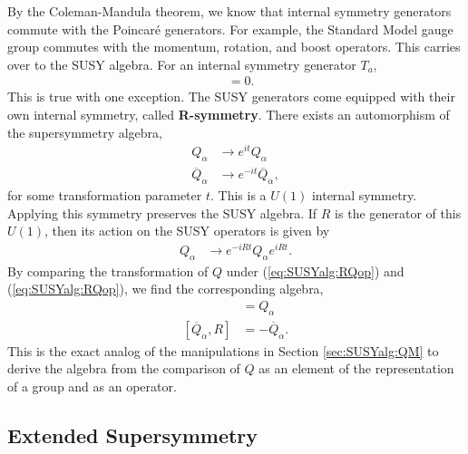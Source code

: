 \documentclass[12pt, oneside]{report}    %
\begin{document}
By the Coleman-Mandula theorem, we know that internal symmetry generators commute with the Poincar\'e generators. For example, the Standard Model gauge group commutes with the momentum, rotation, and boost operators. This carries over to the SUSY algebra. For an internal symmetry generator $T_a$,
\begin{align}
    [T_a,Q_\alpha] &= 0.
\end{align}
This is true with one exception. The SUSY generators come equipped with their own internal symmetry, called \textbf{R-symmetry}. There exists an automorphism of the supersymmetry algebra,
\begin{align}
    Q_\alpha &\rightarrow e^{it}Q_\alpha \label{eq:SUSYalg:RQ}\\
    \overline Q_{\dot\alpha} &\rightarrow e^{-it}\overline Q_{\dot\alpha},\label{eq:SUSYalg:RQbar}
\end{align}
for some transformation parameter $t$.
This is a $U(1)$ internal symmetry. Applying this symmetry preserves the SUSY algebra. If $R$ is the generator of this $U(1)$, then its action on the SUSY operators is given by
\begin{align}
    Q_\alpha &\rightarrow e^{-iRt}Q_\alpha e^{iRt}.\label{eq:SUSYalg:RQop}
\end{align}
By comparing the transformation of $Q$ under (\ref{eq:SUSYalg:RQop}) and (\ref{eq:SUSYalg:RQop}), we find the corresponding algebra,
\begin{align}
    [Q_\alpha,R] &= Q_\alpha\\
    [\overline Q_{\dot\alpha},R] &= -\overline Q_{\dot\alpha}.
\end{align}
This is the exact analog of the manipulations in Section \ref{sec:SUSYalg:QM} to derive the algebra from the comparison of $Q$ as an element of the representation of a group and as an operator.



\subsection{Extended Supersymmetry}
\end{document}
